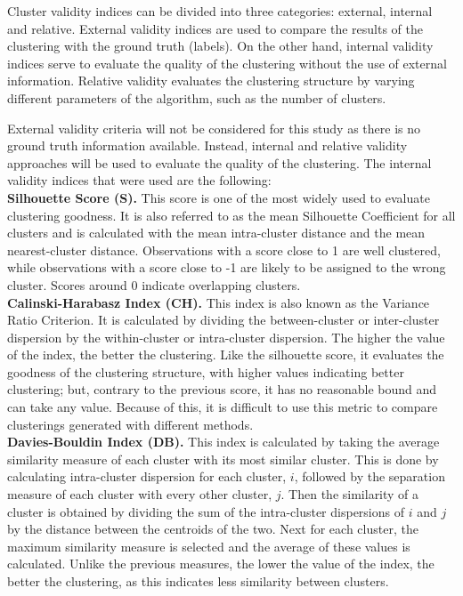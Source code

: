 Cluster validity indices can be divided into three categories: external, internal and relative. External validity indices are used to compare the results of the clustering with the ground truth (labels). On the other hand, internal validity indices serve to evaluate the quality of the clustering without the use of external information. Relative validity evaluates the clustering structure by varying different parameters of the algorithm, such as the number of clusters.

External validity criteria will not be considered for this study as there is no ground truth information available. Instead, internal and relative validity approaches will be used to evaluate the quality of the clustering. The internal validity indices that were used are the following:
\\

\noindent\textbf{Silhouette Score (S).} This score is one of the most widely used to evaluate clustering goodness. It is also referred to as the mean Silhouette Coefficient for all clusters and is calculated with the mean intra-cluster distance and the mean nearest-cluster distance. Observations with a score close to 1 are well clustered, while observations with a score close to -1 are likely to be assigned to the wrong cluster. Scores around 0 indicate overlapping clusters.
\\

\noindent\textbf{Calinski-Harabasz Index (CH).} This index is also known as the Variance Ratio Criterion. It is calculated by dividing the between-cluster or inter-cluster dispersion by the within-cluster or intra-cluster dispersion. The higher the value of the index, the better the clustering. Like the silhouette score, it evaluates the goodness of the clustering structure, with higher values indicating better clustering; but, contrary to the previous score, it has no reasonable bound and can take any value. Because of this, it is difficult to use this metric to compare clusterings generated with different methods.
\\

\noindent\textbf{Davies-Bouldin Index (DB).} This index is calculated by taking the average similarity measure of each cluster with its most similar cluster. This is done by calculating intra-cluster dispersion for each cluster, $i$, followed by the separation measure of each cluster with every other cluster, $j$. Then the similarity of a cluster is obtained by dividing the sum of the intra-cluster dispersions of $i$ and $j$ by the distance between the centroids of the two. Next for each cluster, the maximum similarity measure is selected and the average of these values is calculated. Unlike the previous measures, the lower the value of the index, the better the clustering, as this indicates less similarity between clusters.

